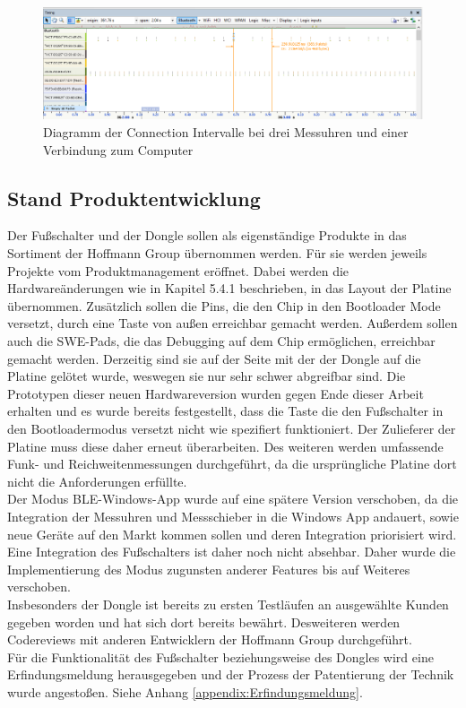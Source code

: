 \begin{figure}[H] 
	\centering
	\includegraphics[width=\textwidth]{figures/ConnectionIntervalle.png}
	\caption{Diagramm der Connection Intervalle bei drei Messuhren und einer Verbindung zum Computer}
\end{figure}


\subsection{Stand Produktentwicklung}
Der Fußschalter und der Dongle sollen als eigenständige Produkte in das Sortiment der Hoffmann Group übernommen werden. Für sie werden jeweils Projekte vom Produktmanagement eröffnet. Dabei werden die Hardwareänderungen wie in Kapitel 5.4.1 beschrieben, in das Layout der Platine übernommen. Zusätzlich sollen die Pins, die den Chip in den Bootloader Mode versetzt, durch eine Taste von außen erreichbar gemacht werden. Außerdem sollen auch die SWE-Pads, die das Debugging auf dem Chip ermöglichen, erreichbar gemacht werden. Derzeitig sind sie auf der Seite mit der der Dongle auf die Platine gelötet wurde, weswegen sie nur sehr schwer abgreifbar sind. Die Prototypen dieser neuen Hardwareversion wurden gegen Ende dieser Arbeit erhalten und es wurde bereits festgestellt, dass die Taste die den Fußschalter in den Bootloadermodus versetzt nicht wie spezifiert funktioniert. Der Zulieferer der Platine muss diese daher erneut überarbeiten. Des weiteren werden umfassende Funk- und Reichweitenmessungen durchgeführt, da die ursprüngliche Platine dort nicht die Anforderungen erfüllte.\\
Der Modus \ac{BLE}-Windows-App wurde auf eine spätere Version verschoben, da die Integration der Messuhren und Messschieber in die Windows App andauert, sowie neue Geräte auf den Markt kommen sollen und deren Integration priorisiert wird. Eine Integration des Fußschalters ist daher noch nicht absehbar. Daher wurde die Implementierung des Modus zugunsten anderer Features bis auf Weiteres verschoben.\\
Insbesonders der Dongle ist bereits zu ersten Testläufen an ausgewählte Kunden gegeben worden und hat sich dort bereits bewährt. Desweiteren werden Codereviews mit anderen Entwicklern der Hoffmann Group durchgeführt.\\
Für die Funktionalität des Fußschalter beziehungsweise des Dongles wird eine Erfindungsmeldung herausgegeben und der Prozess der Patentierung der Technik wurde angestoßen. Siehe Anhang \ref{appendix:Erfindungsmeldung}.
